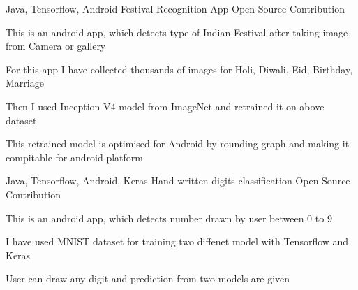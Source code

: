 \begin{cventries}
  \cventry
    {Java, Tensorflow, Android} %
    {Festival Recognition App} %
    {Open Source Contribution} %
    {} %
    {
      \begin{cvitems} %
        \item {This is an android app, which detects type of Indian Festival after taking image from Camera or gallery}
        \item {For this app I have collected thousands of images for Holi, Diwali, Eid, Birthday, Marriage}
        \item {Then I used Inception V4 model from ImageNet and retrained it on above dataset}
        \item {This retrained model is optimised for Android by rounding graph and making it compitable for android platform}
      \end{cvitems}
    }

  \cventry
    {Java, Tensorflow, Android, Keras} %
    {Hand written digits classification} %
    {Open Source Contribution} %
    {} %
    {
      \begin{cvitems} %
        \item {This is an android app, which detects number drawn by user between 0 to 9}
        \item {I have used MNIST dataset for training two diffenet model with Tensorflow and Keras }
        \item {User can draw any digit and prediction from two models are given}
      \end{cvitems}
    }



\end{cventries}
